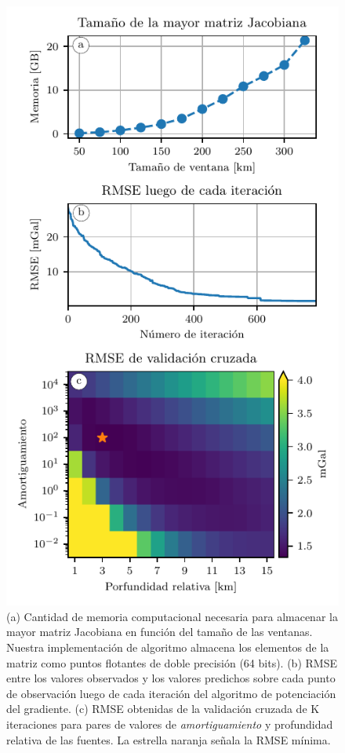 \begin{figure}[p]
    \centering
    \includegraphics[width=0.6\linewidth]{figs/eql-gradient-boosted/australia-memory-cv-error.pdf}
    \caption{
        (a) Cantidad de memoria computacional necesaria para almacenar la mayor
        matriz Jacobiana en función del tamaño de las ventanas. Nuestra
        implementación de algoritmo almacena los elementos de la matriz como
        puntos flotantes de doble precisión (64 bits).
        (b) \acs{RMSE} entre los valores observados y los valores predichos
        sobre cada punto de observación luego de cada iteración del algoritmo
        de potenciación del gradiente.
        (c) \acs{RMSE} obtenidas de la validación cruzada de K iteraciones para
        pares de valores de \emph{amortiguamiento} y profundidad relativa de
        las fuentes.
        La estrella naranja señala la \acs{RMSE} mínima.
    }
    \label{fig:australia-memory-cv-error}
\end{figure}

